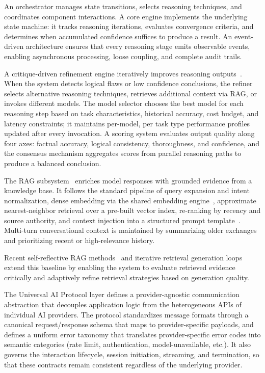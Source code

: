 \documentclass{iopjournal}
\begin{document}
An orchestrator manages state transitions, selects reasoning techniques, and coordinates component interactions. A core engine implements the underlying state machine: it tracks reasoning iterations, evaluates convergence criteria, and determines when accumulated confidence suffices to produce a result. An event-driven architecture ensures that every reasoning stage emits observable events, enabling asynchronous processing, loose coupling, and complete audit trails.

A critique-driven refinement engine iteratively improves reasoning outputs~\cite{Reflexion, SelfRefine}. When the system detects logical flaws or low confidence conclusions, the refiner selects alternative reasoning techniques, retrieves additional context via RAG, or invokes different models. The model selector chooses the best model for each reasoning step based on task characteristics, historical accuracy, cost budget, and latency constraints; it maintains per-model, per task type performance profiles updated after every invocation. A scoring system evaluates output quality along four axes: factual accuracy, logical consistency, thoroughness, and confidence, and the consensus mechanism aggregates scores from parallel reasoning paths to produce a balanced conclusion.

The RAG subsystem~\cite{RAG} enriches model responses with grounded evidence from a knowledge base. It follows the standard pipeline of query expansion and intent normalization, dense embedding via the shared embedding engine~\cite{DPR}, approximate nearest-neighbor retrieval over a pre-built vector index, re-ranking by recency and source authority, and context injection into a structured prompt template~\cite{RAG}. Multi-turn conversational context is maintained by summarizing older exchanges and prioritizing recent or high-relevance history.

Recent self-reflective RAG methods~\cite{SelfRAG_ICLR24} and iterative retrieval generation loops~\cite{IterativeRAG_EMNLP23} extend this baseline by enabling the system to evaluate retrieved evidence critically and adaptively refine retrieval strategies based on generation quality.

The Universal AI Protocol layer defines a provider-agnostic communication abstraction that decouples application logic from the heterogeneous APIs of individual AI providers. The protocol standardizes message formats through a canonical request/response schema that maps to provider-specific payloads, and defines a uniform error taxonomy that translates provider-specific error codes into semantic categories (rate limit, authentication, model-unavailable, etc.). It also governs the interaction lifecycle, session initiation, streaming, and termination, so that these contracts remain consistent regardless of the underlying provider.
\end{document}
